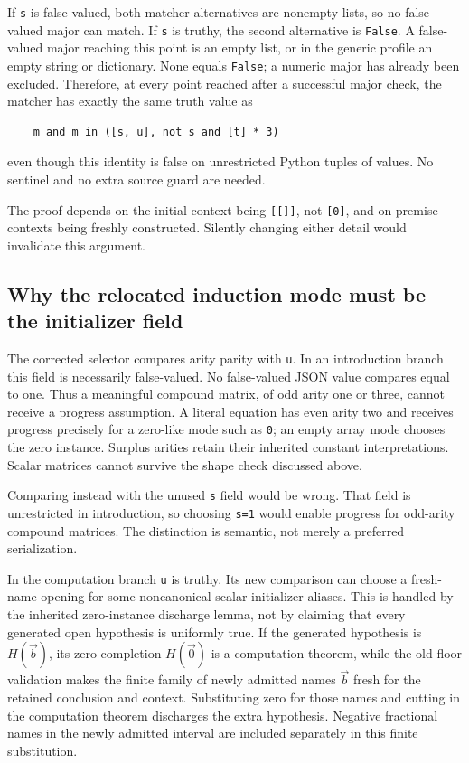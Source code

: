 \documentclass[11pt]{article}
\theoremstyle{definition}\newtheorem{definition}[theorem]{Definition}
\begin{document}
If \texttt{s} is false-valued, both matcher alternatives are nonempty
lists, so no false-valued major can match.  If \texttt{s} is truthy, the
second alternative is \texttt{False}.  A false-valued major reaching
this point is an empty list, or in the generic profile an empty string
or dictionary.  None equals \texttt{False}; a numeric major has already
been excluded.  Therefore, at every point reached after a successful
major check, the matcher has exactly the same truth value as
\begin{verbatim}
    m and m in ([s, u], not s and [t] * 3)
\end{verbatim}
even though this identity is false on unrestricted Python tuples of
values.  No sentinel and no extra source guard are needed.

The proof depends on the initial context being \texttt{[[]]}, not
\texttt{[0]}, and on premise contexts being freshly constructed.
Silently changing either detail would invalidate this argument.

\subsection{Why the relocated induction mode must be the initializer field}

The corrected selector compares arity parity with \texttt{u}.  In an
introduction branch this field is necessarily false-valued.  No
false-valued JSON value compares equal to one.  Thus a meaningful
compound matrix, of odd arity one or three, cannot receive a progress
assumption.  A literal equation has even arity two and receives
progress precisely for a zero-like mode such as \texttt{0}; an empty
array mode chooses the zero instance.  Surplus arities retain their
inherited constant interpretations.  Scalar matrices cannot survive
the shape check discussed above.

Comparing instead with the unused \texttt{s} field would be wrong.
That field is unrestricted in introduction, so choosing
\texttt{s=1} would enable progress for odd-arity compound matrices.
The distinction is semantic, not merely a preferred serialization.

In the computation branch \texttt{u} is truthy.  Its new comparison can
choose a fresh-name opening for some noncanonical scalar initializer
aliases.  This is handled by the inherited zero-instance discharge
lemma, not by claiming that every generated open hypothesis is
uniformly true.  If the generated hypothesis is $H(\vec b)$, its zero
completion $H(\vec0)$ is a computation theorem, while the old-floor
validation makes the finite family of newly admitted names $\vec b$
fresh for the retained conclusion and context.  Substituting zero for
those names and cutting in the computation theorem discharges the
extra hypothesis.  Negative fractional names in the newly admitted
interval are included separately in this finite substitution.
\end{document}
